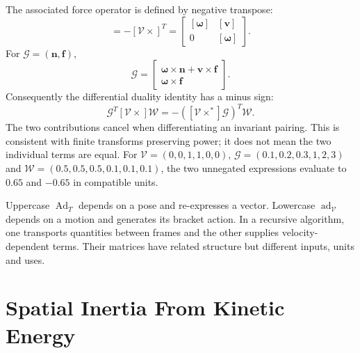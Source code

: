 \label{def:force_cross_def}
The associated force operator is defined by negative transpose:
\begin{equation}
[\mathcal V\times^*]=-[\mathcal V\times]^T
=\begin{bmatrix}[\boldsymbol\omega]&[\mathbf v]\\0&[\boldsymbol\omega]\end{bmatrix}.
\label{eq:force_cross_matrix}
\end{equation}
For $\mathcal G=(\mathbf n,\mathbf f)$,
\begin{equation}
[\mathcal V\times^*]\mathcal G=
\begin{bmatrix}\boldsymbol\omega\times\mathbf n+\mathbf v\times\mathbf f\\
\boldsymbol\omega\times\mathbf f\end{bmatrix}.
\label{eq:force_cross_action}
\end{equation}
\label{princ:duality_principle}
Consequently the differential duality identity has a minus sign:
\begin{equation}
\mathcal G^T[\mathcal V\times]\mathcal W
=-([\mathcal V\times^*]\mathcal G)^T\mathcal W.
\end{equation}
The two contributions cancel when differentiating an invariant pairing. This is consistent with finite transforms preserving power; it does not mean the two individual terms are equal. For $\mathcal V=(0,0,1,1,0,0)$, $\mathcal G=(0.1,0.2,0.3,1,2,3)$ and $\mathcal W=(0.5,0.5,0.5,0.1,0.1,0.1)$, the two unnegated expressions evaluate to $0.65$ and $-0.65$ in compatible units.

\label{princ:ad_vs_Ad}
Uppercase $\operatorname{Ad}_T$ depends on a pose and re-expresses a vector. Lowercase $\operatorname{ad}_{\mathcal V}$ depends on a motion and generates its bracket action. In a recursive algorithm, one transports quantities between frames and the other supplies velocity-dependent terms. Their matrices have related structure but different inputs, units and uses.

\section{Spatial Inertia From Kinetic Energy}
\label{sec:spatial_inertia}
\label{sec:kinetic_energy_spatial_inertia}
\label{def:spatial_inertia_matrix_def}

